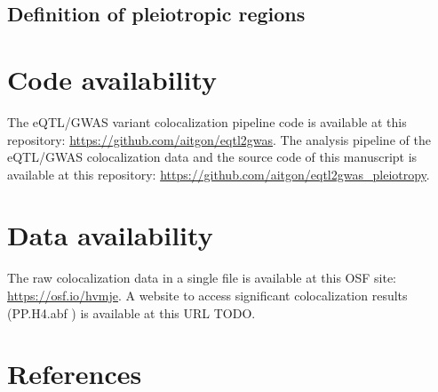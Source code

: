 \subsection*{Definition of pleiotropic regions}

\section*{Code availability}

The eQTL/GWAS variant colocalization pipeline code is available at this repository: \url{https://github.com/aitgon/eqtl2gwas}.
%
The analysis pipeline of the eQTL/GWAS colocalization data and the source code of this manuscript is available at this repository: \url{https://github.com/aitgon/eqtl2gwas_pleiotropy}.

\section*{Data availability}

The raw colocalization data in a single file is available at this OSF site: \url{https://osf.io/hvmje}.
%
A website to access significant colocalization results (PP.H4.abf ) is available at this URL TODO.

\section*{References}




